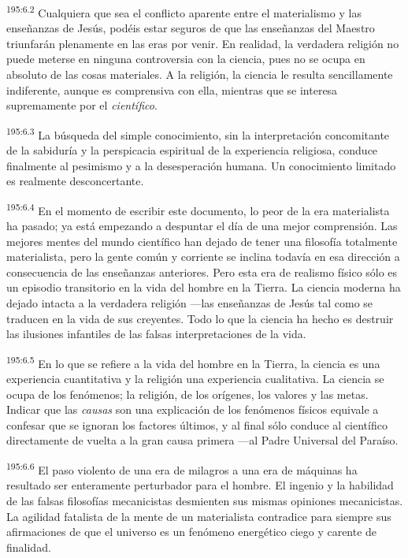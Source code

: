 \par
\textsuperscript{195:6.2} Cualquiera que sea el conflicto aparente entre el materialismo y las enseñanzas de Jesús, podéis estar seguros de que las enseñanzas del Maestro triunfarán plenamente en las eras por venir. En realidad, la verdadera religión no puede meterse en ninguna controversia con la ciencia, pues no se ocupa en absoluto de las cosas materiales. A la religión, la ciencia le resulta sencillamente indiferente, aunque es comprensiva con ella, mientras que se interesa supremamente por el \textit{científico}.

\par
\textsuperscript{195:6.3} La búsqueda del simple conocimiento, sin la interpretación concomitante de la sabiduría y la perspicacia espiritual de la experiencia religiosa, conduce finalmente al pesimismo y a la desesperación humana. Un conocimiento limitado es realmente desconcertante.

\par
\textsuperscript{195:6.4} En el momento de escribir este documento, lo peor de la era materialista ha pasado; ya está empezando a despuntar el día de una mejor comprensión. Las mejores mentes del mundo científico han dejado de tener una filosofía totalmente materialista, pero la gente común y corriente se inclina todavía en esa dirección a consecuencia de las enseñanzas anteriores. Pero esta era de realismo físico sólo es un episodio transitorio en la vida del hombre en la Tierra. La ciencia moderna ha dejado intacta a la verdadera religión ---las enseñanzas de Jesús tal como se traducen en la vida de sus creyentes. Todo lo que la ciencia ha hecho es destruir las ilusiones infantiles de las falsas interpretaciones de la vida.

\par
\textsuperscript{195:6.5} En lo que se refiere a la vida del hombre en la Tierra, la ciencia es una experiencia cuantitativa y la religión una experiencia cualitativa. La ciencia se ocupa de los fenómenos; la religión, de los orígenes, los valores y las metas. Indicar que las \textit{causas} son una explicación de los fenómenos físicos equivale a confesar que se ignoran los factores últimos, y al final sólo conduce al científico directamente de vuelta a la gran causa primera ---al Padre Universal del Paraíso.

\par
\textsuperscript{195:6.6} El paso violento de una era de milagros a una era de máquinas ha resultado ser enteramente perturbador para el hombre. El ingenio y la habilidad de las falsas filosofías mecanicistas desmienten sus mismas opiniones mecanicistas. La agilidad fatalista de la mente de un materialista contradice para siempre sus afirmaciones de que el universo es un fenómeno energético ciego y carente de finalidad.

